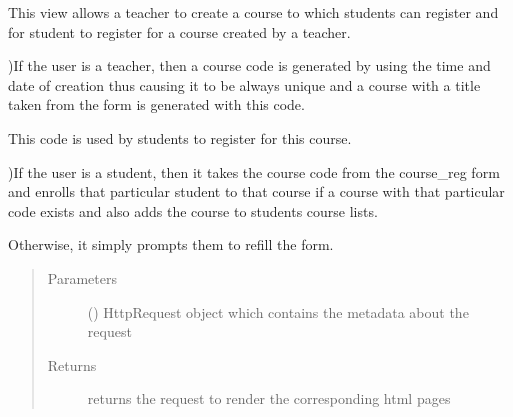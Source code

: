 \documentclass[letterpaper,10pt,english]{sphinxmanual}
\begin{document}
\begin{fulllineitems}
\label{\detokenize{users:users.views.createcourse}}
\sphinxAtStartPar
This view allows a teacher to create a course to which students can register and for student to register for a course created by a teacher.

)If the user is a teacher, then a course code is generated by using the time and date of creation thus causing it to be always unique and a course with a title taken from the form is generated with this code.

\sphinxAtStartPar
This code is used by students to register for this course.

)If the user is a student, then it takes the course code from the course\_reg form and enrolls that particular student to that course if a course with that particular code exists and also adds the course to students course lists.

\sphinxAtStartPar
Otherwise, it simply prompts them to refill the form.
\begin{quote}\begin{description}
\item[{Parameters}] \leavevmode
\sphinxAtStartPar
{} () \textendash{} HttpRequest object which contains the metadata about the request

\item[{Returns}] \leavevmode
\sphinxAtStartPar
returns the request to render the corresponding html pages

\end{description}\end{quote}

\end{fulllineitems}

\end{document}
